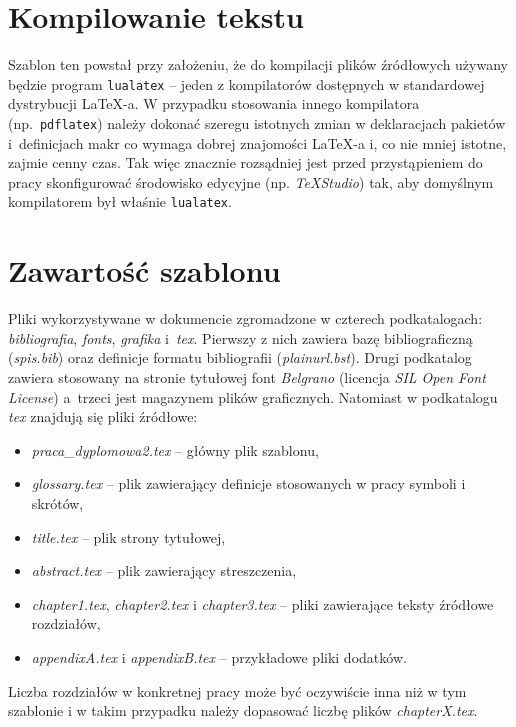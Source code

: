 \section{Kompilowanie tekstu}
Szablon ten powstał przy założeniu, że do kompilacji plików źródłowych używany będzie program \texttt{lualatex} -- jeden z kompilatorów dostępnych w standardowej dystrybucji {\LaTeX}-a. W przypadku stosowania innego kompilatora (np.~\texttt{pdflatex}) należy dokonać szeregu istotnych zmian w deklaracjach pakietów i~definicjach makr co wymaga dobrej znajomości {\LaTeX}-a i, co nie mniej istotne, zajmie cenny czas. Tak więc znacznie rozsądniej jest przed przystąpieniem do pracy  skonfigurować środowisko edycyjne (np. \textit{TeXStudio}) tak, aby domyślnym kompilatorem był właśnie \texttt{lualatex}.

\section{Zawartość szablonu}
Pliki wykorzystywane w dokumencie zgromadzone w czterech podkatalogach: \textit{bibliografia}, \textit{fonts}, \textit{grafika} i~\textit{tex}.
Pierwszy z nich zawiera bazę bibliograficzną (\textit{spis.bib})  oraz definicje formatu bibliografii (\textit{plainurl.bst}). Drugi podkatalog zawiera stosowany na stronie tytułowej font \textit{Belgrano} (licencja \textit{SIL Open Font License}) a~trzeci jest magazynem plików graficznych. Natomiast w podkatalogu \textit{tex} znajdują się pliki źródłowe:

\begin{itemize}
\item \textit{praca\_dyplomowa2.tex} -- główny plik szablonu,
\item \textit{glossary.tex} -- plik zawierający definicje stosowanych w pracy symboli i skrótów,
\item \textit{title.tex} -- plik strony tytułowej,
\item \textit{abstract.tex} -- plik zawierający streszczenia,
\item \textit{chapter1.tex}, \textit{chapter2.tex} i \textit{chapter3.tex} -- pliki zawierające teksty źródłowe rozdziałów, 
\item \textit{appendixA.tex} i \textit{appendixB.tex} -- przykładowe pliki dodatków.
\end{itemize} 
Liczba rozdziałów w konkretnej pracy może być oczywiście inna niż w tym szablonie i w takim przypadku należy dopasować liczbę plików \textit{chapterX.tex}. 



